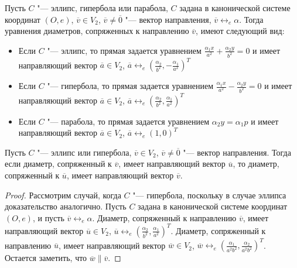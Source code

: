     \begin{note}
    	Пусть $C$ "--- эллипс, гипербола или парабола, $C$ задана в канонической системе координат $(O, e)$, $\overline{v} \in V_2$, $\overline{v} \ne \overline 0$ "--- вектор направления, $\overline{v} \leftrightarrow_{e} \alpha$. Тогда уравнения диаметров, сопряженных к направлению $\overline{v}$, имеют следующий вид:
    	\begin{itemize}
    		\item Если $C$ "--- эллипс, то прямая задается уравнением $\frac{\alpha_1 x}{a^2} + \frac{\alpha_2 y}{b^2} = 0$ и имеет направляющий вектор $\overline a \in V_2$, $\overline{a} \leftrightarrow_{e} (\frac{\alpha_2}{b^2}, -\frac{\alpha_1}{a^2})^T$
    		\item Если $C$ "--- гипербола, то прямая задается уравнением $\frac{\alpha_1 x}{a^2} - \frac{\alpha_2 y}{b^2} = 0$ и имеет направляющий вектор $\overline a \in V_2$, $\overline{a} \leftrightarrow_{e} (\frac{\alpha_2}{b^2}, \frac{\alpha_1}{a^2})^T$
    		\item Если $C$ "--- парабола, то прямая задается уравнением $\alpha_2 y = \alpha_1 p$ и имеет направляющий вектор $\overline a \in V_2$, $\overline{a} \leftrightarrow_{e} (1, 0)^T$
    	\end{itemize}
    \end{note}
    
    \begin{proposition}
    	Пусть $C$ "--- эллипс или гипербола, $\overline{v} \in V_2$, $\overline{v} \ne \overline 0$ "--- вектор направления. Тогда если диаметр, сопряженный к $\overline{v}$, имеет направляющий вектор $\overline{u}$, то диаметр, сопряженный к $\overline{u}$, имеет направляющий вектор $\overline{v}$.
    \end{proposition}
    
    \begin{proof}
    	Рассмотрим случай, когда $C$ "--- гипербола, поскольку в случае эллипса доказательство аналогично. Пусть $C$ задана в канонической системе координат $(O, e)$, и пусть $\overline{v} \leftrightarrow_{e} \alpha$. Диаметр, сопряженный к направлению $\overline{v}$, имеет направляющий вектор $\overline{u} \in V_2$, $\overline u \leftrightarrow_{e} (\frac{\alpha_2}{b^2}, \frac{\alpha_1}{a^2})^T$. Диаметр, сопряженный к направлению $\overline{u}$, имеет направляющий вектор $\overline w \in V_2$, $\overline{w} \leftrightarrow_{e} (\frac{\alpha_1}{a^2b^2}, \frac{\alpha_2}{a^2b^2})^T$. Остается заметить, что $\overline{w} \parallel \overline{v}$.
    \end{proof}
    